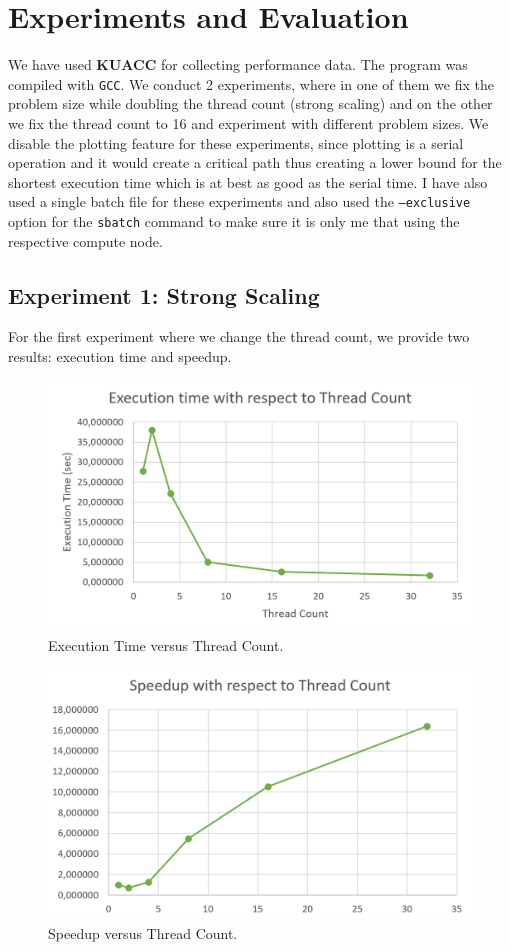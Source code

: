 \documentclass[11pt,reqno]{amsart}
\newcommand{\code}[1]{\texttt{#1}}
\begin{document}
\section{Experiments and Evaluation}
We have used \textbf{KUACC} for collecting performance data. The program was compiled with \code{GCC}. We conduct 2 experiments, where in one of them we fix the problem size while doubling the thread count (strong scaling) and on the other we fix the thread count to 16 and experiment with different problem sizes. We disable the plotting feature for these experiments, since plotting is a serial operation and it would create a critical path thus creating a lower bound for the shortest execution time which is at best as good as the serial time.  I have also used a single batch file for these experiments and also used the \code{--exclusive} option for the \code{sbatch} command to make sure it is only me that using the respective compute node.

\subsection{Experiment 1: Strong Scaling}
For the first experiment where we change the thread count, we provide two results: execution time and speedup.

\begin{figure}[h]
\centering
\label{fig:exp1_1}
\includegraphics[width=0.8\linewidth]{exp1_1.png}
\caption{Execution Time versus Thread Count.}
\end{figure}

\begin{figure}[h]
\centering
\label{fig:exp1_2}
\includegraphics[width=0.8\linewidth]{exp1_2.png}
\caption{Speedup versus Thread Count.}
\end{figure}
\end{document}
